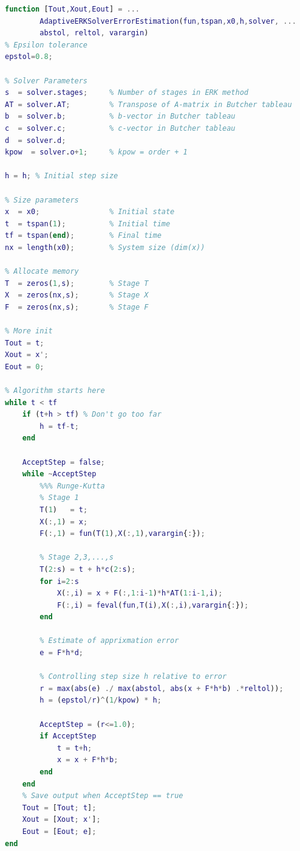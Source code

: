 \begin{adjustwidth*}{0cm}{-0.4cm}
\begin{lstlisting}[frame=single, language=Matlab,caption=Adaptive Explicit Runge-Kutta, label=ERK]
function [Tout,Xout,Eout] = ...
        AdaptiveERKSolverErrorEstimation(fun,tspan,x0,h,solver, ...
        abstol, reltol, varargin)
% Epsilon tolerance
epstol=0.8;

% Solver Parameters
s  = solver.stages;     % Number of stages in ERK method
AT = solver.AT;         % Transpose of A-matrix in Butcher tableau
b  = solver.b;          % b-vector in Butcher tableau
c  = solver.c;          % c-vector in Butcher tableau
d  = solver.d;
kpow  = solver.o+1;     % kpow = order + 1

h = h; % Initial step size

% Size parameters
x  = x0;                % Initial state
t  = tspan(1);          % Initial time
tf = tspan(end);        % Final time
nx = length(x0);        % System size (dim(x))

% Allocate memory
T  = zeros(1,s);        % Stage T
X  = zeros(nx,s);       % Stage X
F  = zeros(nx,s);       % Stage F

% More init
Tout = t;        
Xout = x';
Eout = 0;

% Algorithm starts here
while t < tf
    if (t+h > tf) % Don't go too far
        h = tf-t;
    end

    AcceptStep = false;
    while ~AcceptStep
        %%% Runge-Kutta
        % Stage 1
        T(1)   = t;
        X(:,1) = x;
        F(:,1) = fun(T(1),X(:,1),varargin{:});
        
        % Stage 2,3,...,s
        T(2:s) = t + h*c(2:s);
        for i=2:s
            X(:,i) = x + F(:,1:i-1)*h*AT(1:i-1,i);
            F(:,i) = feval(fun,T(i),X(:,i),varargin{:});
        end

        % Estimate of apprixmation error
        e = F*h*d;

        % Controlling step size h relative to error
        r = max(abs(e) ./ max(abstol, abs(x + F*h*b) .*reltol));
        h = (epstol/r)^(1/kpow) * h;

        AcceptStep = (r<=1.0);
        if AcceptStep
            t = t+h;
            x = x + F*h*b;
        end
    end
    % Save output when AcceptStep == true
    Tout = [Tout; t];
    Xout = [Xout; x'];
    Eout = [Eout; e];
end
\end{lstlisting}
\end{adjustwidth*}

